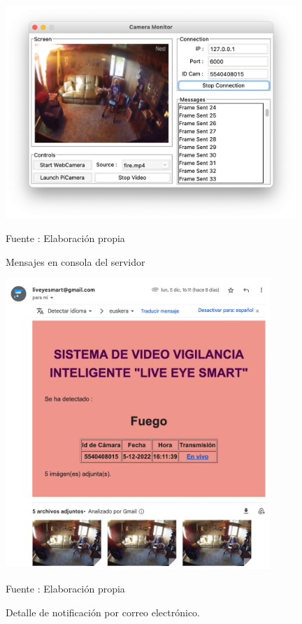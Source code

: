 \begin{figure}[H]
    \begin{center}
        \includegraphics[width=11cm]{img/capitulo_6/fire.png}
    \end{center}
    \begin{center}
        \caption{Mensajes en consola del servidor}
        Fuente : Elaboración propia
    \end{center}
\end{figure}

\begin{figure}[H]
    \begin{center}
        \includegraphics[width=10cm]{img/capitulo_6/mail_fire.png}
    \end{center}
    \begin{center}
        \caption{Detalle de notificación por correo electrónico.}
        Fuente : Elaboración propia
    \end{center}
\end{figure}


